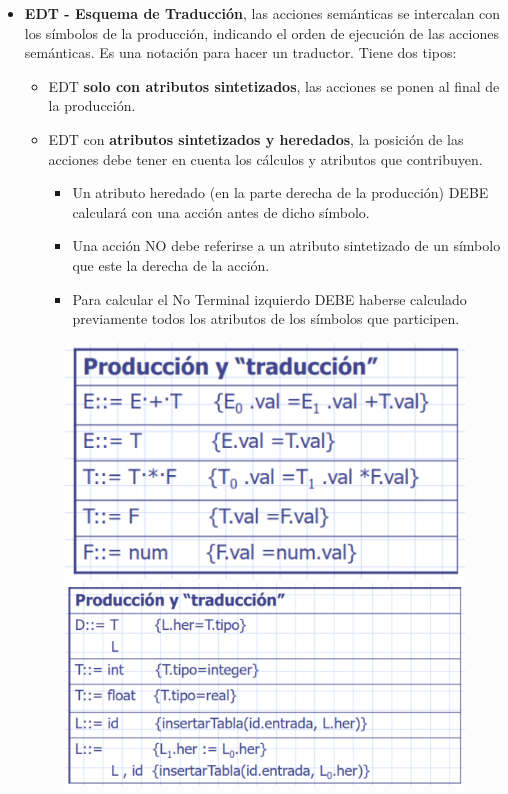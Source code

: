 \documentclass[12pt]{report} %
\begin{document}
\begin{itemize}
  \item \textbf{EDT - Esquema de Traducción}, las acciones semánticas se intercalan con los símbolos de la producción, indicando el orden de ejecución de las acciones semánticas. Es una notación para hacer un traductor. Tiene dos tipos:
  \begin{itemize}
    \item EDT \textbf{solo con atributos sintetizados}, las acciones se ponen al final de la producción.
    \item EDT con \textbf{atributos sintetizados y heredados}, la posición de las acciones debe tener en cuenta los cálculos y atributos que contribuyen.
    \begin{itemize}
      \item Un atributo heredado (en la parte derecha de la producción) DEBE calculará con una acción antes de dicho símbolo.
      \item Una acción NO debe referirse a un atributo sintetizado de un símbolo que este la derecha de la acción.
      \item Para calcular el No Terminal izquierdo DEBE haberse calculado previamente todos los atributos de los símbolos que participen.
    \end{itemize}
  \end{itemize}
  \begin{figure}[H]
    {\includegraphics[scale=.3]{2021-04-21 11_14_06-05_resum_Sem_2021.pdf - Foxit Reader.png}
    \includegraphics[scale=.24]{2021-04-21 11_14_40-05_resum_Sem_2021.pdf - Foxit Reader.png}}
  \end{figure}
\end{itemize}
\end{document}
